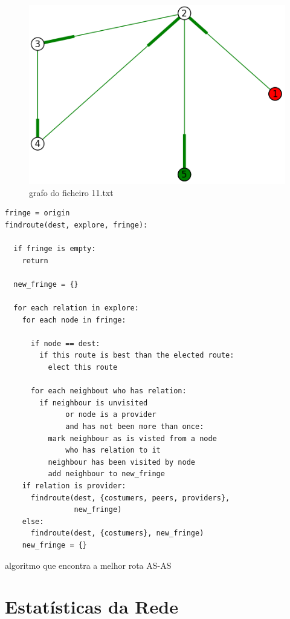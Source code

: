 \documentclass[10pt,a4paper]{article}
\begin{document}
\begin{figure}[h]
\centering
\includegraphics[scale=0.5]{11}
\caption{grafo do ficheiro 11.txt}
\label{fig:11}
\end{figure}


\begin{algorithm}
\begin{lstlisting}
fringe = origin
findroute(dest, explore, fringe):

  if fringe is empty:
    return

  new_fringe = {}

  for each relation in explore:
    for each node in fringe:

      if node == dest:
        if this route is best than the elected route:
          elect this route

      for each neighbout who has relation:
        if neighbour is unvisited
              or node is a provider
              and has not been more than once:
          mark neighbour as is visted from a node
              who has relation to it
          neighbour has been visited by node
          add neighbour to new_fringe
    if relation is provider:
      findroute(dest, {costumers, peers, providers},
                new_fringe)
    else:
      findroute(dest, {costumers}, new_fringe)
    new_fringe = {}

\end{lstlisting}
\caption{algoritmo que encontra a melhor rota AS-AS}
\label{algo:findroute}
\end{algorithm}


\section{Estatísticas da Rede}
\end{document}
